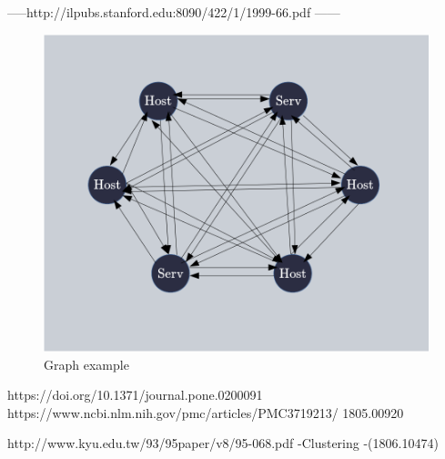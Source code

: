 \documentclass[10pt,a4paper,oneside]{article}
\begin{document}
-----http://ilpubs.stanford.edu:8090/422/1/1999-66.pdf ------ 




\vspace{0.8cm}

\begin{figure}[!h]
\centering
\includegraphics[scale=0.45]{./images/graphe.png}
\caption{Graph example}
\label{graph}
\end{figure}

\vspace{0.8cm}

\begin{multicols}{2}

https://doi.org/10.1371/journal.pone.0200091
https://www.ncbi.nlm.nih.gov/pmc/articles/PMC3719213/
1805.00920


\end{multicols}
http://www.kyu.edu.tw/93/95paper/v8/95-068.pdf
-Clustering
-(1806.10474)
\end{document}
